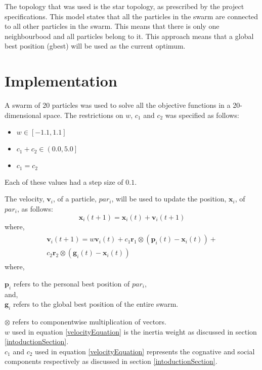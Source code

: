 \documentclass[hidelinks,english,conference]{IEEEtran}
\begin{document}
The topology that was used is the star topology, as prescribed by the project specifications. This model states that all the particles in the swarm are connected to all other particles in the swarm. This means that there is only one neighbourbood and all particles belong to it. This approach means that a global best position (gbest) will be used as the current optimum.

\section{Implementation}
A swarm of 20 particles was used to solve all the objective functions in a 20-dimensional space. The restrictions on $w$, $c_1$ and $c_2$ was specified as follows:
\begin{itemize}
	\item $w \in \left[-1.1, 1.1\right]$
	\item $c_1 + c_2 \in \left(0.0, 5.0\right]$
	\item $c_1 = c_2$
\end{itemize}

Each of these values had a step size of $0.1$.

The velocity, $\textbf{v}_i$, of a particle, $par_i$, will be used to update the position, $\textbf{x}_i$, of $par_i$, as follows:\\
\begin{equation}
	\textbf{x}_i(t+1)=\textbf{x}_i(t) + \textbf{v}_i(t+1)
\end{equation}
where,
\begin{align}\label{velocityEquation}
\begin{split}
	\textbf{v}_i(t+1)=w\textbf{v}_i(t) + c_1\textbf{r}_1 \otimes (\textbf{p}_i(t) - \textbf{x}_i(t)) +\\c_2\textbf{r}_2 \otimes (\textbf{g}_i(t) - \textbf{x}_i(t))
\end{split}
\end{align}
where,\\
\begin{center}
	$\textbf{p}_i$ refers to the personal best position of $par_i$,\\
	and,\\
	$\textbf{g}_i$ refers to the global best position of the entire swarm.
\end{center}

$\otimes$ refers to componentwise multiplication of vectors.\\
$w$ used in equation \ref{velocityEquation} is the inertia weight as discussed in section \ref{intoductionSection}.\\
$c_{1}$ and $c_{2}$  used in equation \ref{velocityEquation} represents the cognative and social components respectively as discussed in section \ref{intoductionSection}.
\end{document}
